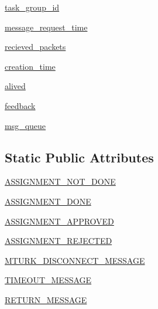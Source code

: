 \begin{DoxyCompactItemize}
\hyperlink{classparlai_1_1mturk_1_1core_1_1agents_1_1MTurkAgent_abf512fbe295ddca93d2489fc5abe4732}{task\+\_\+group\+\_\+id}
\item 
\hyperlink{classparlai_1_1mturk_1_1core_1_1agents_1_1MTurkAgent_afb1d5e2911271fa42cc27e909681090a}{message\+\_\+request\+\_\+time}
\item 
\hyperlink{classparlai_1_1mturk_1_1core_1_1agents_1_1MTurkAgent_afe0dd76c6399e61f4b7a8cd2f439b217}{recieved\+\_\+packets}
\item 
\hyperlink{classparlai_1_1mturk_1_1core_1_1agents_1_1MTurkAgent_aebcc59e3917d5227522e745503f2e813}{creation\+\_\+time}
\item 
\hyperlink{classparlai_1_1mturk_1_1core_1_1agents_1_1MTurkAgent_a97121ee3185b8a5e16da522d115035ca}{alived}
\item 
\hyperlink{classparlai_1_1mturk_1_1core_1_1agents_1_1MTurkAgent_afc4c17ac00ca8efec5cc2cb6aea88765}{feedback}
\item 
\hyperlink{classparlai_1_1mturk_1_1core_1_1agents_1_1MTurkAgent_a789680932f68f3bef45e3ee19d0dc7aa}{msg\+\_\+queue}
\end{DoxyCompactItemize}
\subsection*{Static Public Attributes}
\begin{DoxyCompactItemize}
\item 
\hyperlink{classparlai_1_1mturk_1_1core_1_1agents_1_1MTurkAgent_a42352e22057bf7eeed16c99c9d40b724}{A\+S\+S\+I\+G\+N\+M\+E\+N\+T\+\_\+\+N\+O\+T\+\_\+\+D\+O\+NE}
\item 
\hyperlink{classparlai_1_1mturk_1_1core_1_1agents_1_1MTurkAgent_a4ae18b76dcf72807d2425df2cda055e9}{A\+S\+S\+I\+G\+N\+M\+E\+N\+T\+\_\+\+D\+O\+NE}
\item 
\hyperlink{classparlai_1_1mturk_1_1core_1_1agents_1_1MTurkAgent_a6e5052ac02e7a86225a5f4bdc9d49e2d}{A\+S\+S\+I\+G\+N\+M\+E\+N\+T\+\_\+\+A\+P\+P\+R\+O\+V\+ED}
\item 
\hyperlink{classparlai_1_1mturk_1_1core_1_1agents_1_1MTurkAgent_a2504ea48d002ff9c53c74c37296c46e9}{A\+S\+S\+I\+G\+N\+M\+E\+N\+T\+\_\+\+R\+E\+J\+E\+C\+T\+ED}
\item 
\hyperlink{classparlai_1_1mturk_1_1core_1_1agents_1_1MTurkAgent_a027f6f120329eca8a49893e0071042b9}{M\+T\+U\+R\+K\+\_\+\+D\+I\+S\+C\+O\+N\+N\+E\+C\+T\+\_\+\+M\+E\+S\+S\+A\+GE}
\item 
\hyperlink{classparlai_1_1mturk_1_1core_1_1agents_1_1MTurkAgent_a3e24e99c772d13e949f46ac35def1b96}{T\+I\+M\+E\+O\+U\+T\+\_\+\+M\+E\+S\+S\+A\+GE}
\item 
\hyperlink{classparlai_1_1mturk_1_1core_1_1agents_1_1MTurkAgent_abb50a0000f9615b87a56af128abe1c00}{R\+E\+T\+U\+R\+N\+\_\+\+M\+E\+S\+S\+A\+GE}
\end{DoxyCompactItemize}


